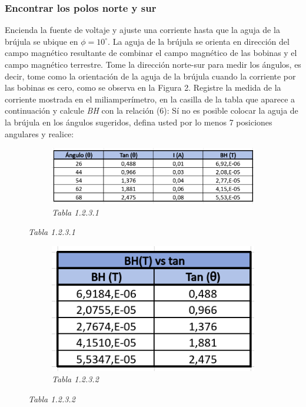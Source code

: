 \subsubsection{Encontrar los polos norte y sur}
Encienda la fuente de voltaje y ajuste una corriente hasta que la aguja de la
brújula se ubique en \(\phi = 10^\circ\). La aguja de la brújula se orienta en dirección del campo
magnético resultante de combinar el campo magnético de las bobinas y el campo
magnético terrestre. Tome la dirección norte-sur para medir los ángulos, es
decir, tome como la orientación de la aguja de la brújula cuando la corriente
por las bobinas es cero, como se observa en la Figura 2. Registre la medida de
la corriente mostrada en el miliamperímetro, en la casilla de la tabla que
aparece a continuación y calcule \textit{BH} con la relación (6): Sí no es posible colocar
la aguja de la brújula en los ángulos sugeridos, defina usted por lo menos 7
posiciones angulares y realice:


\begin{figure}[H]
    \centering
    \begin{subfigure}[b]{\textwidth}
        \centering
        \includegraphics[width=\textwidth]{Figures/0. General/2.3.1.png}
        \caption{\textit{Tabla 1.2.3.1}}
    \end{subfigure}
\end{figure}

\begin{figure}[H]
    \centering
    \begin{subfigure}[b]{0.6\textwidth}
        \centering
        \includegraphics[width=\textwidth]{Figures/0. General/2.3.2.png}
        \caption{\textit{Tabla 1.2.3.2}}
    \end{subfigure}
\end{figure}



